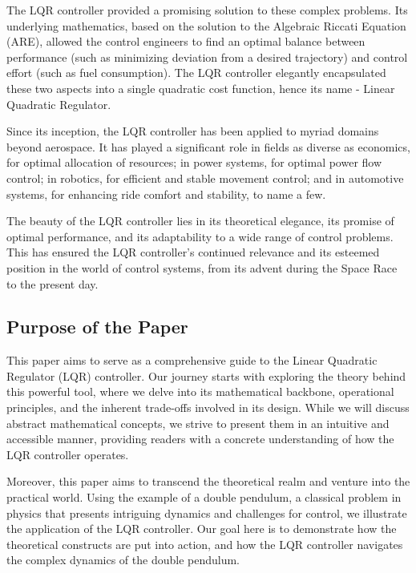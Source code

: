 \documentclass[11pt,twocolumn,twoside,lineno]{pnas-new}
\begin{document}
The LQR controller provided a promising solution to these complex problems. Its underlying mathematics, based on the solution to the Algebraic Riccati Equation (ARE), allowed the control engineers to find an optimal balance between performance (such as minimizing deviation from a desired trajectory) and control effort (such as fuel consumption). The LQR controller elegantly encapsulated these two aspects into a single quadratic cost function, hence its name - Linear Quadratic Regulator.

Since its inception, the LQR controller has been applied to myriad domains beyond aerospace. It has played a significant role in fields as diverse as economics, for optimal allocation of resources; in power systems, for optimal power flow control; in robotics, for efficient and stable movement control; and in automotive systems, for enhancing ride comfort and stability, to name a few.

The beauty of the LQR controller lies in its theoretical elegance, its promise of optimal performance, and its adaptability to a wide range of control problems. This has ensured the LQR controller's continued relevance and its esteemed position in the world of control systems, from its advent during the Space Race to the present day. 

\subsection*{Purpose of the Paper}

This paper aims to serve as a comprehensive guide to the Linear Quadratic Regulator (LQR) controller. Our journey starts with exploring the theory behind this powerful tool, where we delve into its mathematical backbone, operational principles, and the inherent trade-offs involved in its design. While we will discuss abstract mathematical concepts, we strive to present them in an intuitive and accessible manner, providing readers with a concrete understanding of how the LQR controller operates.

Moreover, this paper aims to transcend the theoretical realm and venture into the practical world. Using the example of a double pendulum, a classical problem in physics that presents intriguing dynamics and challenges for control, we illustrate the application of the LQR controller. Our goal here is to demonstrate how the theoretical constructs are put into action, and how the LQR controller navigates the complex dynamics of the double pendulum.
\end{document}
